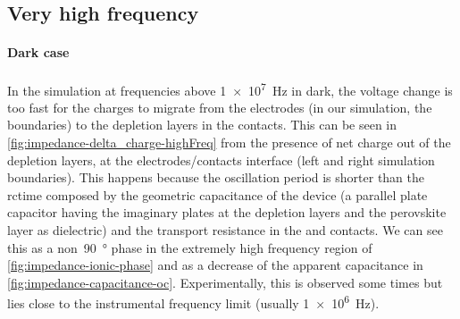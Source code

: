 	\begin{figure}%
	\end{figure}



	\subsection{Very high frequency}
		\paragraph{Dark case}
		In the simulation at frequencies above \SI{1e7}{\Hz} in dark, the voltage change is too fast for the charges to migrate from the electrodes (in our simulation, the boundaries) to the depletion layers in the contacts.
		This can be seen in \cref{fig:impedance-delta_charge-highFreq} from the presence of net charge out of the depletion layers, at the electrodes\-/contacts interface (left and right simulation boundaries).
		This happens because the oscillation period is shorter than the \gls{rctime} composed by the geometric capacitance of the device (a parallel plate capacitor having the imaginary plates at the depletion layers and the perovskite layer as dielectric) and the transport resistance in the  and  contacts.
		We can see this as a non~\SI{90}{\degree} phase in the extremely high frequency region of \cref{fig:impedance-ionic-phase} and as a decrease of the apparent capacitance in \cref{fig:impedance-capacitance-oc}.
		Experimentally, this is observed some times but lies close to the instrumental frequency limit (usually \SI{1e6}{\Hz}).


